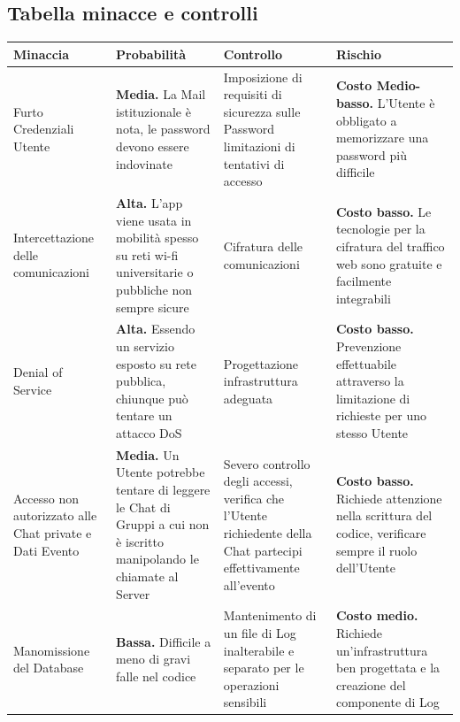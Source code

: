 \documentclass[12pt,a4paper]{report}
\begin{document}
\subsection{Tabella minacce e controlli}
\begin{tabularx}{\textwidth}{|X|X|X|X|}
    \hline
    \rowcolor{studyColor} \textbf{Minaccia} & \textbf{Probabilità} & \textbf{Controllo} & \textbf{Rischio} \\ \hline
    \endhead
    Furto Credenziali Utente & \textbf{Media.} La Mail istituzionale è nota, le password devono essere indovinate & Imposizione di requisiti di sicurezza sulle Password limitazioni di tentativi di accesso
        & \textbf{Costo Medio-basso.} L'Utente è obbligato a memorizzare una password più difficile \\ \hline
    Intercettazione delle comunicazioni & \textbf{Alta.} L'app viene usata in mobilità spesso su reti wi-fi universitarie o pubbliche non sempre sicure & Cifratura delle comunicazioni
        & \textbf{Costo basso.} Le tecnologie per la cifratura del traffico web sono gratuite e facilmente integrabili \\ \hline
    Denial of Service & \textbf{Alta.} Essendo un servizio esposto su rete pubblica, chiunque può tentare un attacco DoS & Progettazione infrastruttura adeguata 
        & \textbf{Costo basso.} Prevenzione effettuabile attraverso la limitazione di richieste per uno stesso Utente \\ \hline
    Accesso non autorizzato alle Chat private e Dati Evento & \textbf{Media.} Un Utente potrebbe tentare di leggere le Chat di Gruppi a cui non è iscritto manipolando le chiamate al Server
        & Severo controllo degli accessi, verifica che l'Utente richiedente della Chat partecipi effettivamente all'evento
        & \textbf{Costo basso.} Richiede attenzione nella scrittura del codice, verificare sempre il ruolo dell'Utente \\ \hline
    Manomissione del Database & \textbf{Bassa.} Difficile a meno di gravi falle nel codice & Mantenimento di un file di Log inalterabile e separato per le operazioni sensibili
        & \textbf{Costo medio.} Richiede un'infrastruttura ben progettata e la creazione del componente di Log \\ \hline
\end{tabularx}
\end{document}
